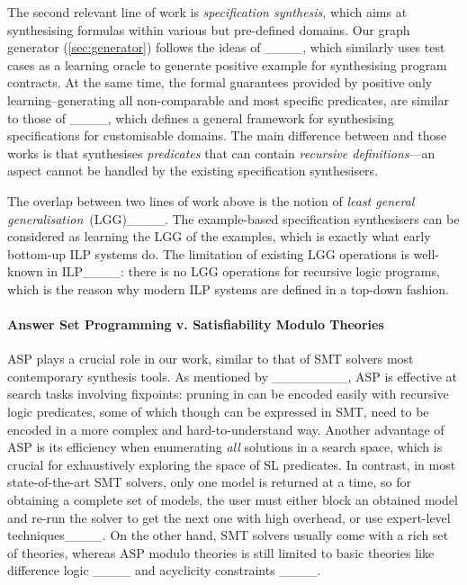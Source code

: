 The second relevant line of work is \emph{specification synthesis},
which aims at synthesising formulas within various but pre-defined
domains. 
%
Our graph generator (\autoref{sec:generator}) follows the ideas of
\precis____, which similarly
uses test cases as a learning oracle to generate positive example
for synthesising program contracts. 
%
At the same time, the formal guarantees provided by positive only
learning--generating all non-comparable and most specific predicates,
are similar to those of ____,
which defines a general framework for synthesising specifications for
customisable domains. The main difference between \tool and those
works is that \tool synthesises \emph{predicates} that can contain
\emph{recursive definitions}---an aspect cannot be handled by the
existing specification synthesisers.

The overlap between two lines of work above is the notion of
\emph{least general generalisation}~(LGG)____. The
example-based specification synthesisers can be considered as learning
the LGG of the examples, which is exactly what early bottom-up ILP
systems do. The limitation of existing LGG operations is well-known in
ILP____: there is no LGG operations for recursive logic
programs, which is the reason why modern ILP systems are defined in a
top-down fashion.

\paragraph{Answer Set Programming v. Satisfiability Modulo Theories}

ASP plays a crucial role in our work, similar to that of SMT solvers
most contemporary synthesis tools. 
%
As mentioned by ________,
ASP is effective at search tasks involving fixpoints: pruning in \tool
can be encoded easily with recursive logic predicates, some of which
though can be expressed in SMT, need to be encoded in a more complex
and hard-to-understand way.
%
Another advantage of ASP is its efficiency when enumerating \emph{all}
solutions in a search space, which is crucial for exhaustively exploring
the space of SL predicates. 
%
In contrast, in most state-of-the-art SMT solvers, only one model is
returned at a time, so for obtaining a complete set of models, the
user must either block an obtained model and re-run the solver to get
the next one with high overhead, or use expert-level
techniques____.
%
On the other hand, SMT solvers usually come with a rich set of
theories, whereas ASP modulo theories is still limited to basic
theories like difference logic
____
and acyclicity constraints ____.